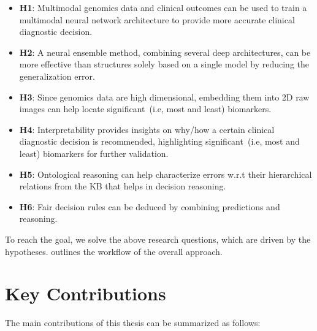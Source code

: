 \begin{itemize}[noitemsep]
    \item \textbf{H1}: Multimodal genomics data and clinical outcomes can be used to train a multimodal neural network architecture to provide more accurate clinical diagnostic decision. 
    \item \textbf{H2}: A neural ensemble method, combining several deep architectures, can be more effective than structures solely based on a single model by reducing the generalization error. 
    \item \textbf{H3}: Since genomics data are high dimensional, embedding them into 2D raw images can help locate significant~(i.e, most and least) biomarkers. 
    \item \textbf{H4}: Interpretability provides insights on why/how a certain clinical diagnostic decision is recommended, highlighting significant~(i.e, most and least) biomarkers for further validation. 
    \item \textbf{H5}: Ontological reasoning can help characterize errors w.r.t their hierarchical relations from the KB that helps in decision reasoning.
    \item \textbf{H6}: Fair decision rules can be deduced by combining predictions and reasoning. 
\end{itemize}

\hspace*{3.5mm} To reach the goal, we solve the above research questions, which are driven by the hypotheses.  outlines the workflow of the overall approach. 

\section{Key Contributions} \label{contributions}
The main contributions of this thesis can be summarized as follows:

